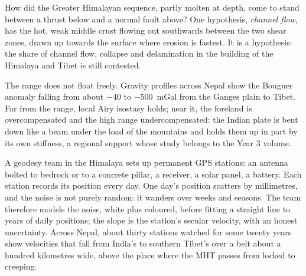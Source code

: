 \begin{omfigure}
\par{}
\end{omfigure}

How did the Greater Himalayan sequence, partly molten at depth, come to stand between a
thrust below and a normal fault above? One hypothesis, \emph{channel flow}, has the hot,
weak middle crust flowing out southwards between the two shear zones, drawn up towards the
surface where erosion is fastest. It is a hypothesis: the share of channel flow, collapse
and delamination in the building of the Himalaya and Tibet is still contested.

The range does not float freely. Gravity profiles across Nepal show the Bouguer anomaly
falling from about $-40$ to \qty{-500}{mGal} from the Ganges plain to Tibet. Far from the
range, local Airy isostasy holds; near it, the foreland is overcompensated and the high
range undercompensated: the Indian plate is bent down like a beam under the load of the
mountains and holds them up in part by its own stiffness, a regional support whose study
belongs to the Year 3 volume.

\begin{inthefield}
A geodesy team in the Himalaya sets up permanent GPS stations: an antenna bolted to bedrock
or to a concrete pillar, a receiver, a solar panel, a battery. Each station records its
position every day. One day's position scatters by millimetres, and the noise is not purely
random: it wanders over weeks and seasons. The team therefore models the noise, white plus
coloured, before fitting a straight line to years of daily positions; the slope is the
station's secular velocity, with an honest uncertainty. Across Nepal, about thirty stations
watched for some twenty years show velocities that fall from India's to southern Tibet's
over a belt about a hundred kilometres wide, above the place where the MHT passes from locked
to creeping.
\end{inthefield}

